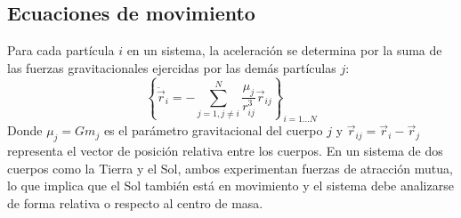 \documentclass[a4paper]{article}
\begin{document}
\subsection{Ecuaciones de movimiento}
Para cada partícula $i$ en un sistema, la aceleración se determina por la suma de las fuerzas gravitacionales ejercidas por las demás partículas $j$:
\begin{equation}
    \left\{ \ddot{\vec{r}}_i = -\sum_{j=1, j \neq i}^{N} \frac{\mu_j}{r_{ij}^3} \vec{r}_{ij} \right\}_{i=1...N}
\end{equation}
Donde $\mu_j = Gm_j$ es el parámetro gravitacional del cuerpo $j$ y $\vec{r}_{ij} = \vec{r}_i - \vec{r}_j$ representa el vector de posición relativa entre los cuerpos. En un sistema de dos cuerpos como la Tierra y el Sol, ambos experimentan fuerzas de atracción mutua, lo que implica que el Sol también está en movimiento y el sistema debe analizarse de forma relativa o respecto al centro de masa.



 
\end{document}
